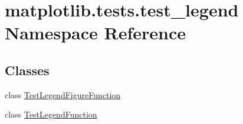\hypertarget{namespacematplotlib_1_1tests_1_1test__legend}{}\section{matplotlib.\+tests.\+test\+\_\+legend Namespace Reference}
\label{namespacematplotlib_1_1tests_1_1test__legend}
\subsection*{Classes}
\begin{DoxyCompactItemize}
\item 
class \hyperlink{classmatplotlib_1_1tests_1_1test__legend_1_1TestLegendFigureFunction}{Test\+Legend\+Figure\+Function}
\item 
class \hyperlink{classmatplotlib_1_1tests_1_1test__legend_1_1TestLegendFunction}{Test\+Legend\+Function}
\end{DoxyCompactItemize}
